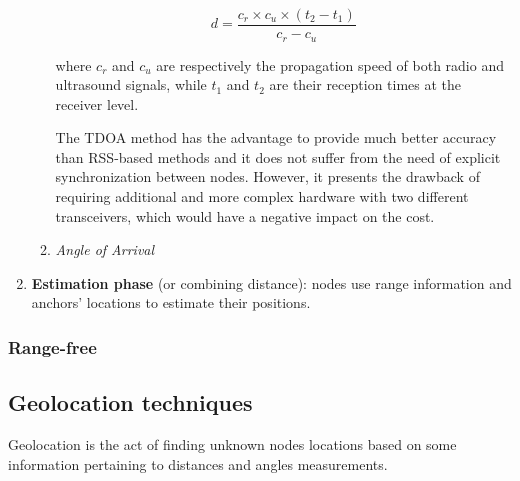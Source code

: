 \documentclass[a4paper,12pt]{article}
\begin{document}
\begin{enumerate}
\begin{enumerate}[label=(\roman*)]
    \begin{equation}
    d = \frac{c_r \times c_u \times (t_2 - t_1)}{c_r - c_u}
    \label{eq:tdoa}
    \end{equation}

    where $c_r$ and $c_u$ are respectively the propagation speed of both radio and ultrasound signals, while $t_1$ and $t_2$ are their reception times at the receiver level.

    The TDOA method has the advantage to provide much better accuracy than RSS-based methods and it does not suffer from the need of explicit synchronization between nodes. However, it presents the drawback of requiring additional and more complex hardware with two different transceivers, which would have a negative impact on the cost.

    \item \textit{Angle of Arrival}
  \end{enumerate}

  \item \textbf{Estimation phase} (or combining distance): nodes use range information and anchors' locations to estimate their positions.
\end{enumerate}

\subsubsection{Range-free}

\subsection{Geolocation techniques}Geolocation is the act of finding unknown nodes locations based on some information pertaining to distances and angles measurements.
\end{document}
